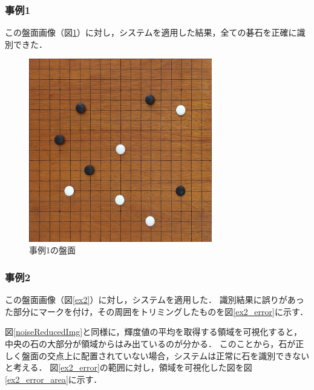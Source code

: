 \documentclass[openright]{nitocs}
\numberwithin{equation}{section}
\begin{document}
            \subsubsection{事例1}
                この盤面画像（図\ref{ex1}）に対し，システムを適用した結果，全ての碁石を正確に識別できた．
                \begin{figure}[tb] %
                    \begin{center}
                    \includegraphics[clip,width=80mm]{DSC_0041/boardImg.jpg} 
                    \caption{事例1の盤面}
                    \label{ex1}
                    \end{center}
                \end{figure}

            \subsubsection{事例2} %
                この盤面画像（図\ref{ex2}）に対し，システムを適用した．
                識別結果に誤りがあった部分にマークを付け，その周囲をトリミングしたものを図\ref{ex2_error}に示す．

                図\ref{noiseReducedImg}と同様に，輝度値の平均を取得する領域を可視化すると，中央の石の大部分が領域からはみ出ているのが分かる．
                このことから，石が正しく盤面の交点上に配置されていない場合，システムは正常に石を識別できないと考える．
                図\ref{ex2_error}の範囲に対し，領域を可視化した図を図\ref{ex2_error_area}に示す．
                
\end{document}
